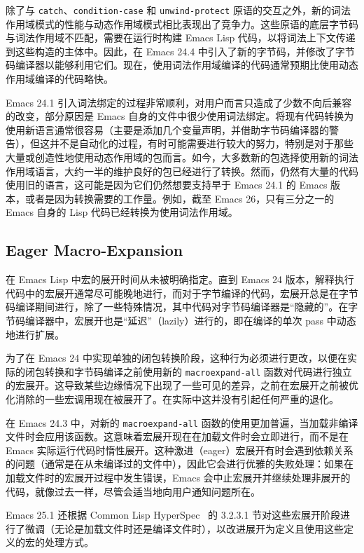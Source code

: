 \documentclass[format=acmsmall,screen]{acmart}
\begin{document}
除了与 \texttt{catch}、\texttt{condition-case} 和 \texttt{unwind-protect} 原语的交互之外，新的词法作用域模式的性能与动态作用域模式相比表现出了竞争力。这些原语的底层字节码与词法作用域不匹配，需要在运行时构建 Emacs Lisp 代码，以将词法上下文传递到这些构造的主体中。因此，在 Emacs 24.4 中引入了新的字节码，并修改了字节码编译器以能够利用它们。现在，使用词法作用域编译的代码通常预期比使用动态作用域编译的代码略快。

Emacs 24.1 引入词法绑定的过程非常顺利，对用户而言只造成了少数不向后兼容的改变，部分原因是 Emacs 自身的文件中很少使用词法绑定。将现有代码转换为使用新语言通常很容易（主要是添加几个变量声明，并借助字节码编译器的警告），但这并不是自动化的过程，有时可能需要进行较大的努力，特别是对于那些大量或创造性地使用动态作用域的包而言。如今，大多数新的包选择使用新的词法作用域语言，大约一半的维护良好的包已经进行了转换。然而，仍然有大量的代码使用旧的语言，这可能是因为它们仍然想要支持早于 Emacs 24.1 的 Emacs 版本，或者是因为转换需要的工作量。例如，截至 Emacs 26，只有三分之一的 Emacs 自身的 Lisp 代码已经转换为使用词法作用域。

\subsection{Eager Macro-Expansion} %
\label{sec:eager-macro-expansion}

在 Emacs Lisp 中宏的展开时间从未被明确指定。直到 Emacs 24 版本，解释执行代码中的宏展开通常尽可能晚地进行，而对于字节编译的代码，宏展开总是在字节码编译期间进行，除了一些特殊情况，其中代码对字节码编译器是“隐藏的”。在字节码编译器中，宏展开也是“延迟”（lazily）进行的，即在编译的单次 pass 中动态地进行扩展。

为了在 Emacs 24 中实现单独的闭包转换阶段，这种行为必须进行更改，以便在实际的闭包转换和字节码编译之前使用新的 \texttt{macroexpand-all} 函数对代码进行独立的宏展开。这导致某些边缘情况下出现了一些可见的差异，之前在宏展开之前被优化消除的一些宏调用现在被展开了。在实际中这并没有引起任何严重的退化。

在 Emacs 24.3 中，对新的 \texttt{macroexpand-all} 函数的使用更加普遍，当加载非编译文件时会应用该函数。这意味着宏展开现在在加载文件时会立即进行，而不是在 Emacs 实际运行代码时惰性展开。这种激进（eager）宏展开有时会遇到依赖关系的问题（通常是在从未编译过的文件中），因此它会进行优雅的失败处理：如果在加载文件时的宏展开过程中发生错误，Emacs 会中止宏展开并继续处理非展开的代码，就像过去一样，尽管会适当地向用户通知问题所在。

Emacs 25.1 还根据 Common Lisp HyperSpec~\cite{HyperSpec} 的 3.2.3.1 节对这些宏展开阶段进行了微调（无论是加载文件时还是编译文件时），以改进展开为定义且使用这些定义的宏的处理方式。
\end{document}
